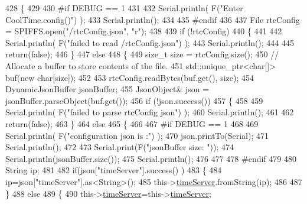 \begin{DoxyCode}
428 \{
429 
430 \textcolor{preprocessor}{#if DEBUG == 1 }
431 
432     Serial.println( F(\textcolor{stringliteral}{"Enter CoolTime.config()"}) );
433     Serial.println();
434 
435 \textcolor{preprocessor}{#endif }
436 
437     File rtcConfig = SPIFFS.open(\textcolor{stringliteral}{"/rtcConfig.json"}, \textcolor{stringliteral}{"r"});
438 
439     \textcolor{keywordflow}{if} (!rtcConfig) 
440     \{
441     
442         Serial.println( F(\textcolor{stringliteral}{"failed to read /rtcConfig.json"}) );
443         Serial.println();
444 
445         \textcolor{keywordflow}{return}(\textcolor{keyword}{false});
446     \}
447     \textcolor{keywordflow}{else}
448     \{
449         \textcolor{keywordtype}{size\_t} size = rtcConfig.size();
450         \textcolor{comment}{// Allocate a buffer to store contents of the file.}
451         std::unique\_ptr<char[]> buf(\textcolor{keyword}{new} \textcolor{keywordtype}{char}[size]);
452 
453         rtcConfig.readBytes(buf.get(), size);
454         DynamicJsonBuffer jsonBuffer;
455         JsonObject& json = jsonBuffer.parseObject(buf.get());
456         \textcolor{keywordflow}{if} (!json.success()) 
457         \{
458 
459             Serial.println( F(\textcolor{stringliteral}{"failed to parse rtcConfig json"}) );
460             Serial.println();
461 
462             \textcolor{keywordflow}{return}(\textcolor{keyword}{false});
463         \} 
464         \textcolor{keywordflow}{else}
465         \{  
466         
467 \textcolor{preprocessor}{        #if DEBUG == 1 }
468 
469             Serial.println( F(\textcolor{stringliteral}{"configuration json is :"}) );
470             json.printTo(Serial);
471             Serial.println();
472 
473             Serial.print(F(\textcolor{stringliteral}{"jsonBuffer size: "}));
474             Serial.println(jsonBuffer.size());
475             Serial.println();
476 
477 
478 \textcolor{preprocessor}{        #endif}
479 
480             String ip;
481             
482             \textcolor{keywordflow}{if}(json[\textcolor{stringliteral}{"timeServer"}].success() )
483             \{           
484                  ip=json[\textcolor{stringliteral}{"timeServer"}].as<String>();
485                 this->\hyperlink{class_cool_time_ad2b9858f399108cb440dd1e908916f04}{timeServer}.fromString(ip);
486                 
487             \}
488             \textcolor{keywordflow}{else}
489             \{
490                 this->\hyperlink{class_cool_time_ad2b9858f399108cb440dd1e908916f04}{timeServer}=this->\hyperlink{class_cool_time_ad2b9858f399108cb440dd1e908916f04}{timeServer};

\end{DoxyCode}
